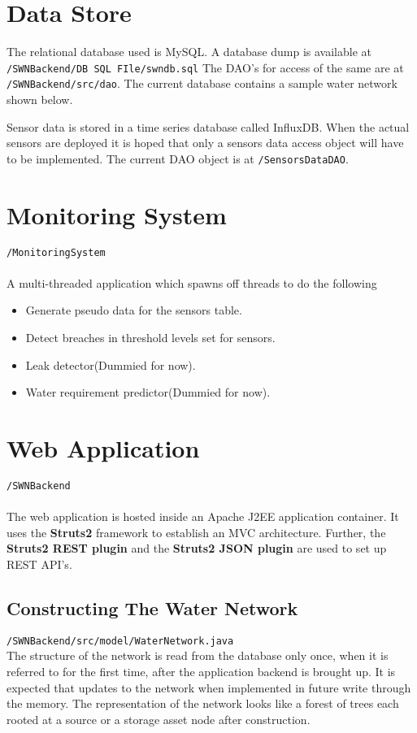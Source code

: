 \documentclass[11pt]{report} %
\begin{document}
\section{Data Store}
The relational database used is MySQL. A database dump is available at \texttt{/SWNBackend/DB SQL FIle/swndb.sql}
The DAO's for access of the same are at \texttt{/SWNBackend/src/dao}.
The current database contains a sample water network shown below.

Sensor data is stored in a time series database called InfluxDB. When the actual sensors are deployed it is hoped that only a sensors data access object will have to be implemented. The current DAO object is at \texttt{/SensorsDataDAO}.

\section{Monitoring System}
\texttt{/MonitoringSystem}\\
\\
A multi-threaded application which spawns off threads to do the following
\begin{itemize}
\item Generate pseudo data for the sensors table.
\item Detect breaches in threshold levels set for sensors.
\item Leak detector(Dummied for now).
\item Water requirement predictor(Dummied for now).
\end{itemize}


\section{Web Application}
\texttt{/SWNBackend} \\
\\
The web application is hosted inside an Apache J2EE application container. It uses the \textbf{ Struts2} framework to establish an MVC architecture. Further, the \textbf{Struts2 REST plugin} and the \textbf{Struts2 JSON plugin} are used to set up REST API's.
\\
\noindent

\subsection{Constructing The Water Network}
\texttt{/SWNBackend/src/model/WaterNetwork.java}
\\
\noindent The structure of the network is read from the database only once, when it is referred to for the first time, after the application backend is brought up. It is expected that updates to the network when implemented in future write through the memory.
\noindent The representation of the network looks like a forest of trees each rooted at a source or a storage asset node after construction.
\end{document}
